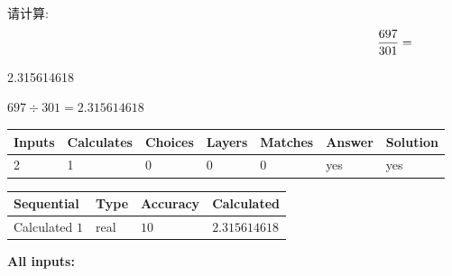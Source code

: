 \documentclass{ctexart}
\begin{document}
请计算:
\begin{equation}
\frac { %
697 }  {  %
301} = \nonumber
\end{equation}
 
 
 
\noindent{}
 
 

2.315614618
 
 
\noindent{}
 
 

 
 
 
\noindent{}
 
 

$ %
697 \div  %
301=   %
2.315614618$
 
 
\noindent{}
 
 

 
   
   
   
   
\noindent\begin{tabular}{|l|l|l|l|l|l|l|}
 \hline
Inputs & Calculates & Choices & Layers & Matches & Answer & Solution \\ \hline
 2  & 
 1  & 
 0
  & 
 0  & 
 0  & 
  yes & 
  yes 
  \\ \hline
 \end{tabular}
   
   
   
   
\noindent{}
   
   
  
  
\noindent\begin{tabular}{|l|l|l|l|}
\hline
 Sequential & Type & Accuracy & Calculated \\ 
\hline
 
 
  Calculated $  1 $ & real & $  10  $ & 
 $ 2.315614618 $ 
 \\  \hline  
 \end{tabular}
   
   
   
   
\noindent\vspace{0.1in}\hspace{-0.08in} {\textbf{\Large{All inputs: }}}
   
\end{document}
